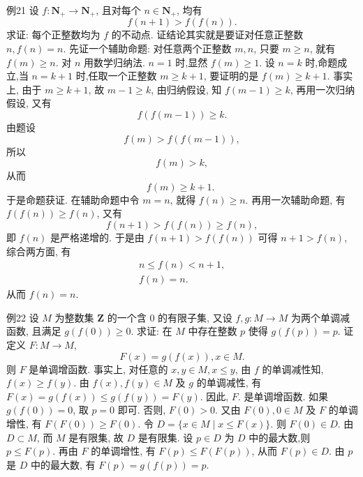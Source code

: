 例21 设 $f: \mathbf{N}_{+} \rightarrow \mathbf{N}_{+}$, 且对每个 $n \in \mathbf{N}_{+}$, 均有
$$
f(n+1)>f(f(n)) .
$$
求证: 每个正整数均为 $f$ 的不动点.
证结论其实就是要证对任意正整数 $n, f(n)=n$. 先证一个辅助命题: 对任意两个正整数 $m, n$, 只要 $m \geqslant n$, 就有 $f(m) \geqslant n$.
对 $n$ 用数学归纳法.
$n=1$ 时,显然 $f(m) \geqslant 1$.
设 $n=k$ 时,命题成立,当 $n=k+1$ 时,任取一个正整数 $m \geqslant k+1$, 要证明的是 $f(m) \geqslant k+1$.
事实上, 由于 $m \geqslant k+1$, 故 $m-1 \geqslant k$, 由归纳假设, 知 $f(m-1) \geqslant k$, 再用一次归纳假设, 又有
$$
f(f(m-1)) \geqslant k .
$$
由题设
$$
f(m)>f(f(m-1)),
$$
所以
$$
f(m)>k,
$$
从而
$$
f(m) \geqslant k+1 \text {. }
$$
于是命题获证.
在辅助命题中令 $m=n$, 就得 $f(n) \geqslant n$. 再用一次辅助命题, 有
$f(f(n)) \geqslant f(n)$, 又有
$$
f(n+1)>f(f(n)) \geqslant f(n),
$$
即 $f(n)$ 是严格递增的.
于是由 $f(n+1)>f(f(n))$ 可得 $n+1>f(n)$, 综合两方面, 有
$$
\begin{gathered}
n \leqslant f(n)<n+1, \\
f(n)=n .
\end{gathered}
$$
从而 $f(n)=n$.



例22 设 $M$ 为整数集 $\mathbf{Z}$ 的一个含 0 的有限子集, 又设 $f, g: M \rightarrow M$ 为两个单调减函数, 且满足 $g(f(0)) \geqslant 0$. 求证: 在 $M$ 中存在整数 $p$ 使得 $g(f(p))=p$.
证定义 $F: M \rightarrow M$,
$$
F(x)=g(f(x)), x \in M .
$$
则 $F$ 是单调增函数.
事实上, 对任意的 $x, y \in M, x \leqslant y$, 由 $f$ 的单调减性知, $f(x) \geqslant f(y)$. 由 $f(x), f(y) \in M$ 及 $g$ 的单调减性, 有 $F(x)=g(f(x)) \leqslant g(f(y))=F(y)$. 因此, $F$. 是单调增函数.
如果 $g(f(0))=0$, 取 $p=0$ 即可.
否则, $F(0)>0$. 又由 $F(0), 0 \in M$ 及 $F$ 的单调增性, 有 $F(F(0)) \geqslant F(0)$. 令 $D=\{x \in M \mid x \leqslant F(x)\}$. 则 $F(0) \in D$.
由 $D \subset M$, 而 $M$ 是有限集, 故 $D$ 是有限集.
设 $p \in D$ 为 $D$ 中的最大数,则 $p \leqslant F(p)$.
再由 $F$ 的单调增性, 有 $F(p) \leqslant F(F(p))$, 从而 $F(p) \in D$. 由 $p$ 是 $D$ 中的最大数, 有 $F(p)=g(f(p))=p$.



